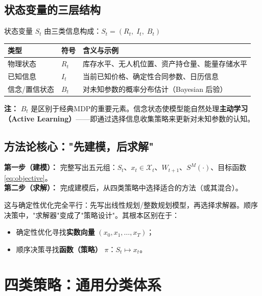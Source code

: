 \documentclass[11pt, a4paper]{article}
\begin{document}
\subsection{状态变量的三层结构}

状态变量 $S_t$ 由三类信息构成：$S_t = (R_t,\; I_t,\; B_t)$

\begin{center}
\begin{tabular}{p{2.5cm}p{2cm}p{9cm}}
\toprule
\textbf{类型} & \textbf{符号} & \textbf{含义与示例} \\
\midrule
物理状态 & $R_t$ & 库存水平、无人机位置、资产持仓量、能量存储水平 \\
\addlinespace
已知信息 & $I_t$ & 当前已知价格、确定性合同参数、日历信息 \\
\addlinespace
信念/置信状态 & $B_t$ & 对未知参数的概率分布估计（Bayesian 后验） \\
\bottomrule
\end{tabular}
\end{center}

\noindent\textbf{注：} $B_t$ 是区别于经典MDP的重要元素。信念状态使模型能自然处理\textbf{主动学习（Active Learning）}——即通过选择信息收集策略来更新对未知参数的认知。

\subsection{方法论核心："先建模，后求解"}

\begin{tcolorbox}[keybox={核心方法论：先建模后求解}]
\textbf{第一步（建模）：} 完整写出五元组：$S_t$、$x_t \in \mathcal{X}_t$、$W_{t+1}$、$S^M(\cdot)$、目标函数 \eqref{eq:objective}。\\[4pt]
\textbf{第二步（求解）：} 完成建模后，从四类策略中选择适合的方法（或其混合）。
\end{tcolorbox}

\noindent 这与确定性优化完全平行：先写出线性规划/整数规划模型，再选择求解器。顺序决策中，"求解器"变成了"策略设计"。其根本区别在于：
\begin{itemize}[leftmargin=2em, itemsep=1pt]
  \item 确定性优化寻找\textbf{实数向量} $(x_0, x_1, \ldots, x_T)$；
  \item 顺序决策寻找\textbf{函数（策略）} $\pi$：$S_t \mapsto x_t$。
\end{itemize}

\section{四类策略：通用分类体系}
\end{document}
